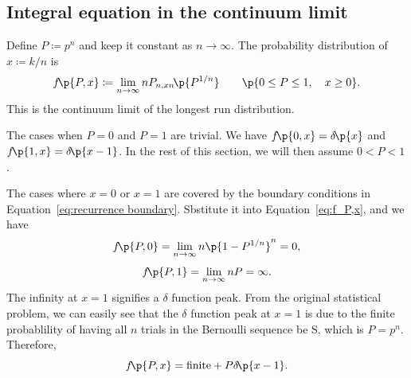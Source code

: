 \documentclass[oneside,12pt,final]{ucthesis-CA2012}
\newcommand{\mrm}[1]{\mathrm{#1}}
\newcommand{\dlt}{\delta}
\newcommand{\ceq}{\coloneqq}
\newcommand{\fc}[2]{#1\mathchoice{\!}{\!}{}{}\p{#2}} %
\begin{document}
\begin{mainmatter}
\chapter{Integral equation in the continuum limit}
\label{sec:continuum}

Define $P\ceq p^n$ and keep it constant as $n\to\infty$.
The probability distribution of $x\ceq k/n$ is
\begin{equation}
	\label{eq:f_P,x}
	\fc f{P,x}\ceq\lim_{n\to\infty}n\fc{P_{n,xn}}{P^{1/n}}\qquad\p{0\le P\le1,\quad x\ge0}.
\end{equation}
This is the continuum limit of the longest run distribution.

The cases when $P=0$ and $P=1$ are trivial.
We have $\fc f{0,x}=\fc\dlt x$ and $\fc f{1,x}=\fc\dlt{x-1}$.
In the rest of this section, we will then assume $0<P<1$.

The cases where $x=0$ or $x=1$ are covered by the boundary conditions
in Equation~\ref{eq:recurrence boundary}.
Sbstitute it into Equation~\ref{eq:f_P,x}, and we have
\begin{equation}
	\label{eq:x=0}
	\fc f{P,0}=\lim_{n\to\infty}n\p{1-P^{1/n}}^n=0,
\end{equation}
\[\fc f{P,1}=\lim_{n\to\infty}nP=\infty.\]
The infinity at $x=1$ signifies a $\dlt$ function peak.
From the original statistical problem, we can easily see that the $\dlt$ function peak at $x=1$
is due to the finite probablility of having all $n$ trials in the Bernoulli sequence be S,
which is $P=p^n$.
Therefore,
\begin{equation}
	\label{eq:x=1}
	\fc f{P,x}=\mrm{finite}+P\fc\dlt{x-1}.
\end{equation}


\end{mainmatter}
\end{document}
